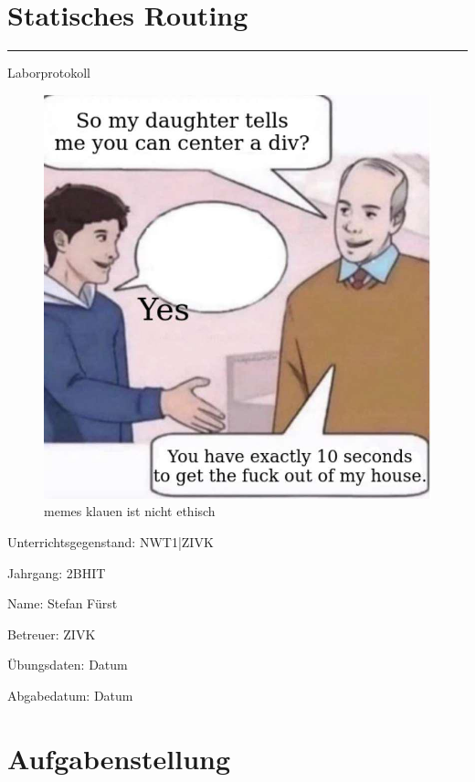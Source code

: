 \documentclass[a4paper]{article}
\begin{document}
\pagestyle{oida}
\section*{Statisches Routing}
\par\noindent\rule{\textwidth}{0.4pt}

Laborprotokoll

\begin{figure}[h]
\includegraphics[scale=0.6]{meme.jpeg}
\caption{memes klauen ist nicht ethisch}
\end{figure}

\vspace*{\fill}
Unterrichtsgegenstand:	NWT1|ZIVK

Jahrgang:	2BHIT

Name:	Stefan Fürst

Betreuer: 	ZIVK

Übungsdaten:	Datum

Abgabedatum:	Datum


\newpage
\tableofcontents

\newpage

\section{Aufgabenstellung}
\end{document}
